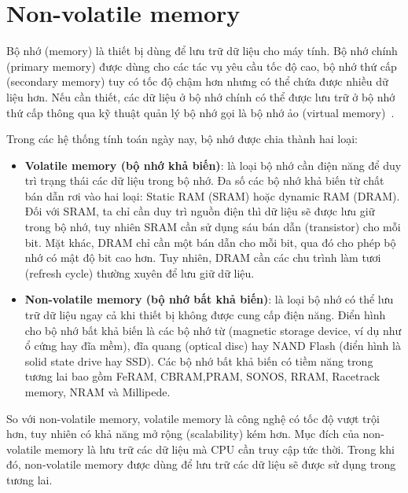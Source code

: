 \section{Non-volatile memory}
\label{chap:non-volatile-memory}

Bộ nhớ (memory) là thiết bị dùng để lưu trữ dữ liệu cho máy tính. Bộ nhớ chính
(primary memory) được dùng cho các tác vụ yêu cầu tốc độ cao, bộ nhớ thứ cấp
(secondary memory) tuy có tốc độ chậm hơn nhưng có thể chứa được nhiều dữ liệu
hơn. Nếu cần thiết, các dữ liệu ở bộ nhớ chính có thể được lưu trữ ở bộ nhớ thứ
cấp thông qua kỹ thuật quản lý bộ nhớ gọi là bộ nhớ ảo (virtual
memory)~\cite{VolatileNonVolatileComputer}.

Trong các hệ thống tính toán ngày nay, bộ nhớ được chia thành hai loại:

\begin{itemize}
    \item \textbf{Volatile memory (bộ nhớ khả biến)}: là loại bộ nhớ cần điện
    năng để duy trì trạng thái các dữ liệu trong bộ nhớ. Đa số các bộ nhớ khả
    biến từ chất bán dẫn rơi vào hai loại: Static RAM (SRAM) hoặc dynamic RAM
    (DRAM). Đối với SRAM, ta chỉ cần duy trì nguồn điện thì dữ liệu sẽ được lưu
    giữ trong bộ nhớ, tuy nhiên SRAM cần sử dụng sáu bán dẫn (transistor) cho
    mỗi bit. Mặt khác, DRAM chỉ cần một bán dẫn cho mỗi bit, qua đó cho phép bộ
    nhớ có mật độ bit cao hơn. Tuy nhiên, DRAM cần các chu trình làm tươi
    (refresh cycle) thường xuyên để lưu giữ dữ liệu.
    
    \item \textbf{Non-volatile memory (bộ nhớ bất khả biến)}: là loại bộ nhớ có
    thể lưu trữ dữ liệu ngay cả khi thiết bị không được cung cấp điện năng.
    Điển hình cho bộ nhớ bất khả biến là các bộ nhớ từ (magnetic storage
    device, ví dụ như ổ cứng hay đĩa mềm), đĩa quang (optical disc) hay NAND
    Flash (điển hình là solid state drive hay SSD). Các bộ nhớ bất khả biến có
    tiềm năng trong tương lai bao gồm FeRAM, CBRAM,PRAM, SONOS, RRAM, Racetrack
    memory, NRAM và Millipede.
\end{itemize}

So với non-volatile memory, volatile memory là công nghệ có tốc độ vượt trội
hơn, tuy nhiên có khả năng mở rộng (scalability) kém hơn. Mục đích của
non-volatile memory là lưu trữ các dữ liệu mà CPU cần truy cập tức thời. Trong
khi đó, non-volatile memory được dùng để lưu trữ các dữ liệu sẽ được sử dụng
trong tương lai.

